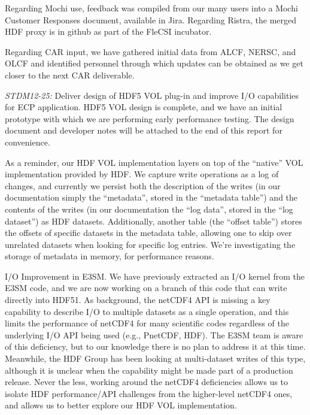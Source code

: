 Regarding Mochi use, feedback was compiled from our many users into a Mochi
Customer Responses document, available in Jira.  Regarding Ristra, the merged
HDF proxy is in github as part of the FleCSI incubator.

Regarding CAR input, we have gathered initial data from ALCF, NERSC, and OLCF
and identified personnel through which updates can be obtained as we get closer
to the next CAR deliverable. 

\emph{STDM12-25:} Deliver design of HDF5 VOL plug-in and improve I/O
capabilities for ECP application. HDF5 VOL design is complete, and we have an
initial prototype with which we are performing early performance testing. The
design document and developer notes will be attached to the end of this report
for convenience.

As a reminder, our HDF VOL implementation layers on top of the “native” VOL
implementation provided by HDF. We capture write operations as a log of
changes, and currently we persist both the description of the writes (in our
documentation simply the “metadata”, stored in the “metadata table”) and the
contents of the writes (in our documentation the “log data”, stored in the “log
dataset”) as HDF datasets. Additionally, another table (the “offset table”)
stores the offsets of specific datasets in the metadata table, allowing one to
skip over unrelated datasets when looking for specific log entries. We’re
investigating the storage of metadata in memory, for performance reasons.

I/O Improvement in E3SM. We have previously extracted an I/O kernel from the
E3SM code, and we are now working on a branch of this code that can write
directly into HDF51. As background, the netCDF4 API is missing a key capability
to describe I/O to multiple datasets as a single operation, and this limits the
performance of netCDF4 for many scientific codes regardless of the underlying
I/O API being used (e.g., PnetCDF, HDF). The E3SM team is aware of this
deficiency, but to our knowledge there is no plan to address it at this time.
Meanwhile, the HDF Group has been looking at multi-dataset writes of this type,
although it is unclear when the capability might be made part of a production
release. Never the less, working around the netCDF4 deficiencies allows us to
isolate HDF performance/API challenges from the higher-level netCDF4 ones, and
allows us to better explore our HDF VOL implementation.

